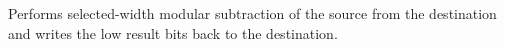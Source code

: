 Performs selected-width modular subtraction of the source from the destination and writes the low result bits back to the destination.
